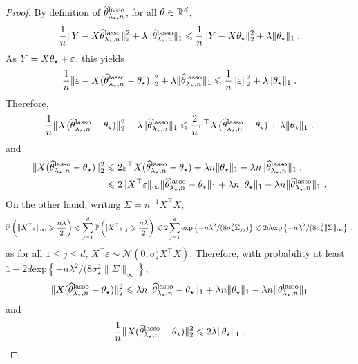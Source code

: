 \begin{proof}
By definition of $\widehat{\theta}^{\mathrm{lasso}}_{\lambda_\star,n}$, for all $\theta\in\mathbb{R}^d$,
$$
\frac{1}{n}\|Y - X\widehat{\theta}^{\mathrm{lasso}}_{\lambda_\star,n}\|_2^2 + \lambda\|\widehat{\theta}^{\mathrm{lasso}}_{\lambda_\star,n}\|_1 \leqslant \frac{1}{n}\|Y - X\theta_\star\|_2^2 + \lambda\|\theta_\star\|_1\;.
$$
As $Y = X\theta_\star + \varepsilon$, this yields
$$
\frac{1}{n}\|\varepsilon - X(\widehat{\theta}^{\mathrm{lasso}}_{\lambda_\star,n}-\theta_\star)\|_2^2 + \lambda\|\widehat{\theta}^{\mathrm{lasso}}_{\lambda_\star,n}\|_1 \leqslant \frac{1}{n}\|\varepsilon\|_2^2 + \lambda\|\theta_\star\|_1\;.
$$
Therefore,
$$
\frac{1}{n}\|X(\widehat{\theta}^{\mathrm{lasso}}_{\lambda_\star,n}-\theta_\star)\|_2^2 + \lambda\|\widehat{\theta}^{\mathrm{lasso}}_{\lambda_\star,n}\|_1 \leqslant \frac{2}{n}\varepsilon^\top X(\widehat{\theta}^{\mathrm{lasso}}_{\lambda_\star,n}-\theta_\star) + \lambda\|\theta_\star\|_1\;.
$$
and
\begin{align}
\|X(\widehat{\theta}^{\mathrm{lasso}}_{\lambda_\star,n}-\theta_\star)\|_2^2  &\leqslant 2\varepsilon^\top X(\widehat{\theta}^{\mathrm{lasso}}_{\lambda_\star,n}-\theta_\star) + \lambda n \|\theta_\star\|_1 - \lambda n \|\widehat{\theta}^{\mathrm{lasso}}_{\lambda_\star,n}\|_1\;,\label{eq:lasso:general:bound}\\
&\leqslant 2 \|X^\top \varepsilon\|_\infty \|\widehat{\theta}^{\mathrm{lasso}}_{\lambda_\star,n}-\theta_\star\|_1   + \lambda n \|\theta_\star\|_1 - \lambda n \|\widehat{\theta}^{\mathrm{lasso}}_{\lambda_\star,n}\|_1\;.\nonumber
\end{align}
On the other hand, writing $\Sigma = n^{-1}X^\top X$,
$$
\mathbb{P}\left(\|X^\top\varepsilon\|_\infty \geqslant \frac{n\lambda}{2}\right) \leqslant \sum_{j=1}^{d} \mathbb{P}\left(|X^\top\varepsilon|_j \geqslant \frac{n\lambda}{2}\right) \leqslant 2\sum_{j=1}^{d}\mathrm{exp}\left\{-n\lambda^2/(8\sigma_\star^2  \Sigma_{jj})\right\} \leqslant 2 d\mathrm{exp}\left\{-n\lambda^2/(8\sigma_\star^2  \|\Sigma\|_\infty\right\}\;,
$$
as for all $1\leqslant j\leqslant d$, $X^\top\varepsilon\sim \mathcal{N}(0,\sigma_\star^2 X^\top X)$. Therefore, with probability at least $1 - 2 d\mathrm{exp}\left\{-n\lambda^2/(8\sigma_\star^2  \|\Sigma\|_\infty\right\}$,
$$
\|X(\widehat{\theta}^{\mathrm{lasso}}_{\lambda_\star,n}-\theta_\star)\|_2^2  \leqslant  \lambda n  \|\widehat{\theta}^{\mathrm{lasso}}_{\lambda_\star,n}-\theta_\star\|_1   + \lambda n \|\theta_\star\|_1 - \lambda n \|\theta^{\mathrm{lasso}}_{\lambda_\star,n}\|_1
$$
and
$$
\frac{1}{n}\|X(\widehat{\theta}^{\mathrm{lasso}}_{\lambda_\star,n}-\theta_\star)\|_2^2  \leqslant 2\lambda \|\theta_\star\|_1 \;.
$$
\end{proof}
